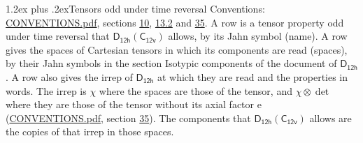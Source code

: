 \documentclass[10pt,a4paper]{article}
\makeatletter
\renewcommand\section{\@startsection{section}{1}{\z@}{-3ex plus -1ex minus -.2ex}%
  {1.2ex plus .2ex}{\normalfont\large\sffamily\bfseries\color{parttitle}}}
\numberwithin{equation}{section}
\newcommand{\grp}[1]{\mathsf{#1}}
\newcommand{\irrprod}{\otimes}
\makeatother
\begin{document}
\section{Tensors odd under time reversal}\label{s:time_odd}
Conventions: \href{../../CONVENTIONS.pdf}{CONVENTIONS.pdf}, sections \href{../../../rotation/CONVENTIONS.pdf\#conv.10}{10}, \href{../../../rotation/CONVENTIONS.pdf\#conv.13.2}{13.2} and \href{../../CONVENTIONS.pdf\#conv.35}{35}.
\leavevmode\label{n:head.name.property}A row is a tensor property odd under time reversal that $\grp{D_{12h}}(\grp{C_{12v}})$ allows, by its Jahn symbol (name). \label{n:head.spaces}A row gives the spaces of Cartesian tensors in which its components are read (spaces), by their Jahn symbols in the section Isotypic components of the document of \href{../../../rotation/data/pdf/D12h.pdf}{$\grp{D_{12h}}$}. \label{n:head.properties}A row also gives the irrep of $\grp{D_{12h}}$ at which they are read and the properties in words. The irrep is $\chi$ where the spaces are those of the tensor, and $\chi \irrprod \det$ where they are those of the tensor without its axial factor e (\href{../../CONVENTIONS.pdf}{CONVENTIONS.pdf}, section \href{../../CONVENTIONS.pdf\#conv.35}{35}). The components that $\grp{D_{12h}}(\grp{C_{12v}})$ allows are the copies of that irrep in those spaces.
\end{document}
